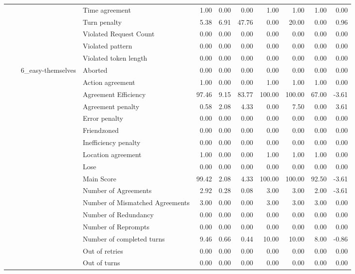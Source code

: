 \begin{tabular}{llllrrrrrrr}
 &  &  & Time agreement & 1.00 & 0.00 & 0.00 & 1.00 & 1.00 & 1.00 & 0.00 \\
 &  &  & Turn penalty & 5.38 & 6.91 & 47.76 & 0.00 & 20.00 & 0.00 & 0.96 \\
 &  &  & Violated Request Count & 0.00 & 0.00 & 0.00 & 0.00 & 0.00 & 0.00 & 0.00 \\
 &  &  & Violated pattern & 0.00 & 0.00 & 0.00 & 0.00 & 0.00 & 0.00 & 0.00 \\
 &  &  & Violated token length & 0.00 & 0.00 & 0.00 & 0.00 & 0.00 & 0.00 & 0.00 \\
\cline{3-11}
 &  & \multirow[t]{27}{*}{6_easy-themselves} & Aborted & 0.00 & 0.00 & 0.00 & 0.00 & 0.00 & 0.00 & 0.00 \\
 &  &  & Action agreement & 1.00 & 0.00 & 0.00 & 1.00 & 1.00 & 1.00 & 0.00 \\
 &  &  & Agreement Efficiency & 97.46 & 9.15 & 83.77 & 100.00 & 100.00 & 67.00 & -3.61 \\
 &  &  & Agreement penalty & 0.58 & 2.08 & 4.33 & 0.00 & 7.50 & 0.00 & 3.61 \\
 &  &  & Error penalty & 0.00 & 0.00 & 0.00 & 0.00 & 0.00 & 0.00 & 0.00 \\
 &  &  & Friendzoned & 0.00 & 0.00 & 0.00 & 0.00 & 0.00 & 0.00 & 0.00 \\
 &  &  & Inefficiency penalty & 0.00 & 0.00 & 0.00 & 0.00 & 0.00 & 0.00 & 0.00 \\
 &  &  & Location agreement & 1.00 & 0.00 & 0.00 & 1.00 & 1.00 & 1.00 & 0.00 \\
 &  &  & Lose & 0.00 & 0.00 & 0.00 & 0.00 & 0.00 & 0.00 & 0.00 \\
 &  &  & Main Score & 99.42 & 2.08 & 4.33 & 100.00 & 100.00 & 92.50 & -3.61 \\
 &  &  & Number of Agreements & 2.92 & 0.28 & 0.08 & 3.00 & 3.00 & 2.00 & -3.61 \\
 &  &  & Number of Mismatched Agreements & 3.00 & 0.00 & 0.00 & 3.00 & 3.00 & 3.00 & 0.00 \\
 &  &  & Number of Redundancy & 0.00 & 0.00 & 0.00 & 0.00 & 0.00 & 0.00 & 0.00 \\
 &  &  & Number of Reprompts & 0.00 & 0.00 & 0.00 & 0.00 & 0.00 & 0.00 & 0.00 \\
 &  &  & Number of completed turns & 9.46 & 0.66 & 0.44 & 10.00 & 10.00 & 8.00 & -0.86 \\
 &  &  & Out of retries & 0.00 & 0.00 & 0.00 & 0.00 & 0.00 & 0.00 & 0.00 \\
 &  &  & Out of turns & 0.00 & 0.00 & 0.00 & 0.00 & 0.00 & 0.00 & 0.00 \\

\end{tabular}
